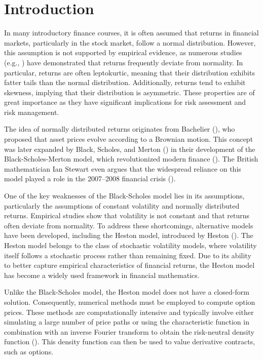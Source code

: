\chapter{Introduction}
\label{sec:introduction}

In many introductory finance courses, it is often assumed that returns in financial markets, particularly in the stock market, follow a normal distribution. However, this assumption is not supported by empirical evidence, as numerous studies (e.g., \cite{mandelbrotVariationCertainSpeculative1997,hullValueRiskWhen1998,karoglouBreakingNonnormalityStock2010}) have demonstrated that returns frequently deviate from normality. In particular, returns are often leptokurtic, meaning that their distribution exhibits fatter tails than the normal distribution. Additionally, returns tend to exhibit skewness, implying that their distribution is asymmetric. These properties are of great importance as they have significant implications for risk assessment and risk management.

The idea of normally distributed returns originates from Bachelier (\citeyear{bachelierTheorySpeculation1900}), who proposed that asset prices evolve according to a Brownian motion. This concept was later expanded by Black, Scholes, and Merton (\citeyear{blackPricingOptionsCorporate1973}) in their development of the Black-Scholes-Merton model, which revolutionized modern finance (\cite{heimerGenesisBlackScholesOption2008}). The British mathematician Ian Stewart even argues that the widespread reliance on this model played a role in the 2007–2008 financial crisis (\cite{stewartPursuitUnknown172012}).

One of the key weaknesses of the Black-Scholes model lies in its assumptions, particularly the assumptions of constant volatility and normally distributed returns. Empirical studies show that volatility is not constant and that returns often deviate from normality. To address these shortcomings, alternative models have been developed, including the Heston model, introduced by Heston (\citeyear{hestonClosedFormSolutionOptions1993}). The Heston model belongs to the class of stochastic volatility models, where volatility itself follows a stochastic process rather than remaining fixed. Due to its ability to better capture empirical characteristics of financial returns, the Heston model has become a widely used framework in financial mathematics.

Unlike the Black-Scholes model, the Heston model does not have a closed-form solution. Consequently, numerical methods must be employed to compute option prices. These methods are computationally intensive and typically involve either simulating a large number of price paths or using the characteristic function in combination with an inverse Fourier transform to obtain the risk-neutral density function (\cite{gatheralVolatilitySurfacePractitioner2011}). This density function can then be used to value derivative contracts, such as options.

